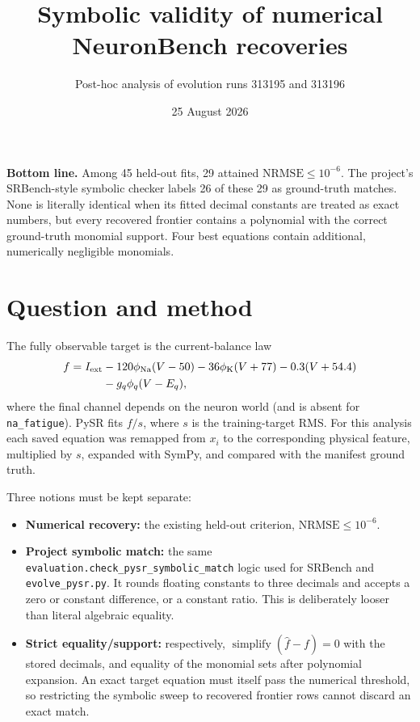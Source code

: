 \documentclass[10pt]{article}
\title{\vspace{-2.0em}\textcolor{accent}{\bfseries Symbolic validity of numerical NeuronBench recoveries}}
\author{Post-hoc analysis of evolution runs 313195 and 313196}
\date{25 August 2026}
\newcommand{\nrmse}{\mathrm{NRMSE}}
\newcommand{\phina}{\phi_{\mathrm{Na}}}
\newcommand{\phik}{\phi_{\mathrm{K}}}
\begin{document}
\maketitle
\vspace{-1.5em}

\colorbox{soft}{\parbox{0.965\linewidth}{
\textbf{Bottom line.} Among 45 held-out fits, 29 attained $\nrmse\le10^{-6}$.
The project's SRBench-style symbolic checker labels 26 of these 29 as ground-truth
matches.  None is literally identical when its fitted decimal constants are treated
as exact numbers, but every recovered frontier contains a polynomial with the correct
ground-truth monomial support.  Four best equations contain additional, numerically
negligible monomials.
}}

\section*{Question and method}

The fully observable target is the current-balance law
\begin{align*}
f = I_{\rm ext}
  &-120\phina(V-50)-36\phik(V+77)-0.3(V+54.4)\\
  &-g_q\phi_q(V-E_q),
\end{align*}
where the final channel depends on the neuron world (and is absent for
\texttt{na\_fatigue}).  PySR fits $f/s$, where $s$ is the training-target RMS.
For this analysis each saved equation was remapped from $x_i$ to the corresponding
physical feature, multiplied by $s$, expanded with SymPy, and compared with the
manifest ground truth.

Three notions must be kept separate:
\begin{itemize}
  \item \textbf{Numerical recovery:} the existing held-out criterion,
  $\nrmse\le10^{-6}$.
  \item \textbf{Project symbolic match:} the same
  \texttt{evaluation.check\_pysr\_symbolic\_match} logic used for SRBench and
  \texttt{evolve\_pysr.py}.  It rounds floating constants to three decimals and
  accepts a zero or constant difference, or a constant ratio.  This is deliberately
  looser than literal algebraic equality.
  \item \textbf{Strict equality/support:} respectively,
  $\operatorname{simplify}(\hat f-f)=0$ with the stored decimals, and equality of
  the monomial sets after polynomial expansion.  An exact target equation must
  itself pass the numerical threshold, so restricting the symbolic sweep to
  recovered frontier rows cannot discard an exact match.
\end{itemize}
\end{document}
